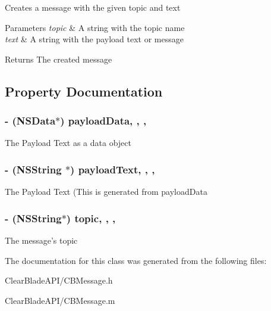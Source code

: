 Creates a message with the given topic and text 
\begin{DoxyParams}{Parameters}
{\em topic} & A string with the topic name \\
\hline
{\em text} & A string with the payload text or message \\
\hline
\end{DoxyParams}
\begin{DoxyReturn}{Returns}
The created message 
\end{DoxyReturn}


\subsection{Property Documentation}
\hypertarget{interface_c_b_message_a11c9f8c3e5d3e137f6d735ffb3fa7560}{
\subsubsection[{payload\+Data}]{\setlength{\rightskip}{0pt plus 5cm}-\/ (N\+S\+Data$\ast$) payload\+Data\hspace{0.3cm}{\ttfamily [read]}, {\ttfamily [write]}, {\ttfamily [nonatomic]}, {\ttfamily [strong]}}}\label{interface_c_b_message_a11c9f8c3e5d3e137f6d735ffb3fa7560}
The Payload Text as a data object \hypertarget{interface_c_b_message_a40254070a83d97673d850d08437fc44b}{
\subsubsection[{payload\+Text}]{\setlength{\rightskip}{0pt plus 5cm}-\/ (N\+S\+String $\ast$) payload\+Text\hspace{0.3cm}{\ttfamily [read]}, {\ttfamily [write]}, {\ttfamily [nonatomic]}, {\ttfamily [strong]}}}\label{interface_c_b_message_a40254070a83d97673d850d08437fc44b}
The Payload Text (This is generated from payload\+Data \hypertarget{interface_c_b_message_a5fef01f2b51495307023ad95e772c632}{
\subsubsection[{topic}]{\setlength{\rightskip}{0pt plus 5cm}-\/ (N\+S\+String$\ast$) topic\hspace{0.3cm}{\ttfamily [read]}, {\ttfamily [write]}, {\ttfamily [nonatomic]}, {\ttfamily [strong]}}}\label{interface_c_b_message_a5fef01f2b51495307023ad95e772c632}
The message's topic 

The documentation for this class was generated from the following files\+:\begin{DoxyCompactItemize}
\item 
Clear\+Blade\+A\+P\+I/C\+B\+Message.\+h\item 
Clear\+Blade\+A\+P\+I/C\+B\+Message.\+m\end{DoxyCompactItemize}
